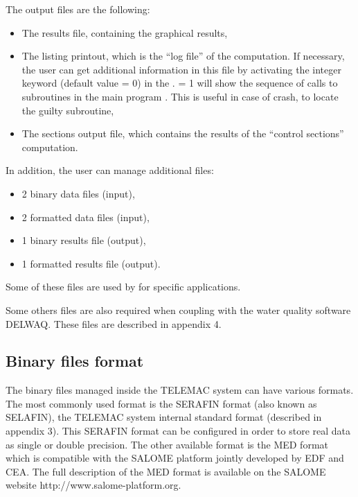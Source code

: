 The output files are the following:

\begin{itemize}
\item The results file, containing the graphical results,

\item The listing printout, which is the ``log file'' of the computation.
If necessary, the user can get additional information in this file by activating
the integer keyword  (default value = 0) in the
.
 = 1 will show the sequence of calls to subroutines in the main
program .
This is useful in case of crash, to locate the guilty subroutine,

\item The sections output file, which contains the results of the
``control sections'' computation.
\end{itemize}

In addition, the user can manage additional files:

\begin{itemize}
\item 2 binary data files (input),

\item 2 formatted data files (input),

\item 1 binary results file (output),

\item 1 formatted results file (output).
\end{itemize}

Some of these files are used by  for specific applications.

Some others files are also required when coupling  with the water
quality software DELWAQ.
These files are described in appendix 4.


\subsection{Binary files format}
\label{subs:binfile}

The binary files managed inside the TELEMAC system can have various formats.
The most commonly used format is the SERAFIN format (also known as SELAFIN),
the TELEMAC system internal standard format (described in appendix 3).
This SERAFIN format can be configured in order to store real data
as single or double precision.
The other available format is the MED format which is compatible with
the SALOME platform jointly developed by EDF and CEA.
The full description of the MED format is available on the SALOME website
http://www.salome-platform.org.

